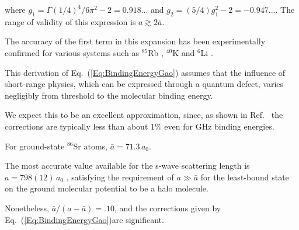 where $g_1=\Gamma(1/4)^4/6\pi^2-2=0.918...$ and $g_2=(5/4)g_1^2-2=-0.947...$. The range of validity of this expression is $a \gtrsim 2 \bar{a}$.

The accuracy of the first term in this expansion has been experimentally confirmed for various systems such as $^{85}$Rb \cite{ckt03,kgb03}, $^{40}$K \cite{rtb03,msg05} and $^{6}$Li \cite{bar05}.

This derivation of Eq.\ (\ref{Eq:BindingEnergyGao}) assumes that the influence of short-range physics, which can be expressed through a quantum defect, varies negligibly from threshold to the molecular binding energy.

We expect this to be an excellent approximation, since, as shown in Ref.~\cite{gao01} the corrections are typically less than about $1\%$ even for GHz binding energies.





For ground-state $^{86}$Sr atoms, $\bar{a}=71.3$\,$a_0$.

The most accurate value available for the s-wave scattering length is $a=798 (12)$\,$a_0$ \cite{skt10}, satisfying the requirement of $a\gg \bar{a}$ for the least-bound state on the ground molecular potential to be a halo molecule.

Nonetheless, ${\bar{a}}/({a-\bar{a}})=.10$, and the corrections given by Eq.\ (\ref{Eq:BindingEnergyGao})are significant.

